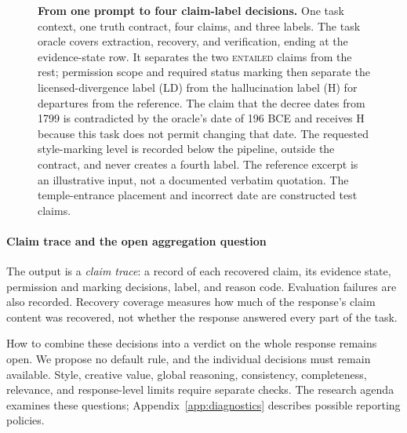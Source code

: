 \documentclass{clv2025}
\newcommand{\LD}{\textsc{LD}}
\newcommand{\Hall}{\textsc{H}}
\begin{document}
\begin{figure}[!t]
{}
\caption{\textbf{From one prompt to four claim-label decisions.}
One task context, one truth contract, four claims, and three labels. The task
oracle covers extraction, recovery, and verification, ending at the evidence-state
row. It separates the two \textsc{entailed} claims
from the rest; permission scope and required status marking then separate the
licensed-divergence label (\LD) from the hallucination label (\Hall) for
departures from the reference. The claim that the decree dates from
1799 is contradicted by the oracle's date of 196 BCE and receives \Hall{}
because this task does not permit changing that date. The requested style-marking level is
recorded below the pipeline,
outside the contract, and never creates a fourth label. The reference excerpt is an illustrative input, not a documented verbatim quotation. The temple-entrance placement and incorrect date are constructed test claims.}
\label{fig:claim-label-annotation}
\end{figure}
\FloatBarrier

\paragraph{Claim trace and the open aggregation question}\label{subsec:response}

The output is a \emph{claim trace}: a record of each recovered claim, its
evidence state, permission and marking decisions, label, and reason code.
Evaluation failures are also recorded. Recovery coverage measures how much
of the response's claim content was recovered, not whether the response
answered every part of the task.

How to combine these decisions into a verdict on the whole response remains
open. We propose no default rule, and the individual decisions must remain
available. Style, creative value, global reasoning, consistency, completeness,
relevance, and response-level limits require separate checks. The research
agenda examines these questions; Appendix~\ref{app:diagnostics} describes
possible reporting policies.
\end{document}

